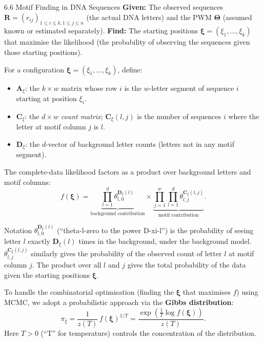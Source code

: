 \documentclass[aspectratio=169,10pt]{beamer}
\begin{document}
\begin{frame}[allowframebreaks]{6.6 Motif Finding in DNA Sequences}
\textbf{Given:} The observed sequences $\mathbf{R} = (r_{ij})_{1 \le i \le k, 1 \le j \le n}$ (the actual DNA letters) and the PWM $\boldsymbol\Theta$ (assumed known or estimated separately).
\textbf{Find:} The starting positions $\boldsymbol\xi = (\xi_1, \ldots, \xi_k)$ that maximise the likelihood (the probability of observing the sequences given those starting positions).

For a configuration $\boldsymbol\xi = (\xi_1, \ldots, \xi_k)$, define:
\begin{itemize}
  \item $\mathbf{A}_\xi$: the $k \times w$ matrix whose row $i$ is the $w$-letter segment of sequence $i$ starting at position $\xi_i$.
  \item $\mathbf{C}_\xi$: the $d \times w$ \emph{count matrix}; $\mathbf{C}_\xi(l,j)$ is the number of sequences $i$ where the letter at motif column $j$ is $l$.
  \item $\mathbf{D}_\xi$: the $d$-vector of background letter counts (letters not in any motif segment).
\end{itemize}
The complete-data likelihood factors as a product over background letters and motif columns:
\[
  f(\boldsymbol\xi) = \underbrace{\prod_{l=1}^d \theta_{l,0}^{\mathbf{D}_\xi(l)}}_{\text{background contribution}} \times \underbrace{\prod_{j=1}^w \prod_{l=1}^d \theta_{l,j}^{\mathbf{C}_\xi(l,j)}}_{\text{motif contribution}}.
\]

\begin{block}{Notation}
$\theta_{l,0}^{\mathbf{D}_\xi(l)}$ (``theta-l-zero to the power D-xi-l'') is the probability of seeing letter $l$ exactly $\mathbf{D}_\xi(l)$ times in the background, under the background model.
$\theta_{l,j}^{\mathbf{C}_\xi(l,j)}$ similarly gives the probability of the observed count of letter $l$ at motif column $j$.
The product over all $l$ and $j$ gives the total probability of the data given the starting positions $\boldsymbol\xi$.
\end{block}

\framebreak

To handle the combinatorial optimisation (finding the $\boldsymbol\xi$ that maximises $f$) using MCMC, we adopt a probabilistic approach via the \textbf{Gibbs distribution}:
\[
  \pi_\xi = \frac{1}{z(T)}\, f(\boldsymbol\xi)^{1/T} = \frac{\exp\!\left(\frac{1}{T}\log f(\boldsymbol\xi)\right)}{z(T)}.
\]
Here $T > 0$ (``T'' for temperature) controls the concentration of the distribution.


\end{frame}
\end{document}
